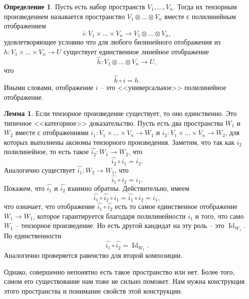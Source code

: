 \documentclass[10pt,a4paper,oneside]{book}
\theoremstyle{definition}
\newtheorem*{defn}{{\color{yellow!30!red} Определение}}
\newtheorem{lem}{{\color{green!50!black} Лемма}}
\newcommand{\id}{\operatorname{Id}}
\def\dfn{\begin{defn}}
\def\edfn{\end{defn}}
\def\lm{\begin{lem}}
\def\elm{\end{lem}}
\begin{document}
\dfn Пусть есть набор пространств $V_1, \dots,V_n$. Тогда их тензорным произведением называется пространство 
$V_1\otimes \dots \otimes V_n$ вместе с полилинейным отображением
$$i \colon V_1 \times \dots \times V_n \to V_1 \otimes \dots \otimes V_n,$$
удовлетворяющее условию что для любого билинейного отображения из $h\colon V_1\times \dots \times V_n \to U$ существует единственное линейное отображение 
$$\hat{h}\colon V_1\otimes \dots \otimes V_n \to U,$$
что 
$$\hat{h}\circ i=h.$$
Иными словами, отображение $i$ -- это <<универсальное>> полилинейное отображение.
\edfn 


\lm Если тензорное произведение существует, то оно единственно.
\proof Это типичное <<категорное>> доказательство. Пусть есть два пространства $W_1$ и $W_2$ вместе с отображениями $i_1 \colon V_1\times \dots\times V_n \to W_1$ и $i_2 \colon V_1\times \dots\times V_n \to W_2$, для которых выполнены аксиомы тензорного произведения. Заметим, что так как $i_2$ полилинейное, то есть такое $\hat{i_2} \colon W_1 \to W_2$, что $$\hat{i_2}\circ i_1= i_2.$$ 
Аналогично существует $\hat{i_1} \colon W_2 \to W_1$, что
$$\hat{i_1}\circ i_2= i_1.$$ 
Покажем, что $\hat{i_1} $ и $\hat{i_2}$ взаимно обратны. Действительно, имеем
$$\hat{i_1}\circ \hat{i_2}\circ i_1= \hat{i_1}\circ i_2= i_1,$$
что означает, что отображение $\hat{i_1}\circ \hat{i_2}$ есть то самое единственное отображение $W_1\to W_1$, которое гарантируется благодаря полилинейности $i_1$ и того, что само $W_1$ -- тензорное произведение. Но есть другой кандидат на эту роль -- это $\id_{W_1}$. По единственности 
$$\hat{i_1}\circ \hat{i_2}=\id_{W_1}.$$
Аналогично проверяется равенство для второй композиции.
\endproof
\elm


Однако, совершенно непонятно есть такое пространство или нет. Более того, самом его существование нам тоже не сильно поможет. Нам нужна конструкция этого пространства и понимание свойств этой конструкции.
\end{document}
